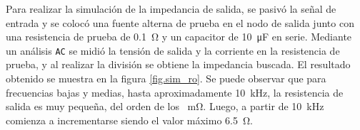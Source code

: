 
Para realizar la simulación de la impedancia de salida, se pasivó la señal de entrada y se colocó una fuente alterna de prueba en el nodo de salida junto con una resistencia de prueba de \SI{0.1}{\ohm} y un capacitor de \SI{10}{\micro\farad} en serie. Mediante un análisis \texttt{AC} se midió la tensión de salida y la corriente en la resistencia de prueba, y al realizar la división se obtiene la impedancia buscada. El resultado obtenido se muestra en la figura \ref{fig.sim_ro}. Se puede observar que para frecuencias bajas y medias, hasta aproximadamente \SI{10}{\kilo\hertz}, la resistencia de salida es muy pequeña, del orden de los \SI{}{\milli\ohm}. Luego, a partir de \SI{10}{\kilo\hertz} comienza a incrementarse siendo el valor máximo \SI{6.5}{\ohm}.
